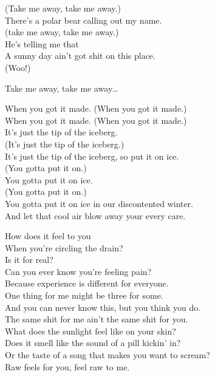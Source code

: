 (Take me away, take me away.) \\
There's a polar bear calling out my name. \\
(take me away, take me away.) \\
He's telling me that \\
A sunny day ain't got shit on this place. \\
(Woo!)

Take me away, take me away… \\


When you got it made. (When you got it made.) \\
When you got it made. (When you got it made.) \\

It's just the tip of the iceberg. \\
(It's just the tip of the iceberg.) \\
It's just the tip of the iceberg, so put it on ice. \\
(You gotta put it on.) \\

You gotta put it on ice. \\
(You gotta put it on.) \\
You gotta put it on ice in our discontented winter. \\
And let that cool air blow away your every care. \\




How does it feel to you \\
When you're circling the drain? \\
Is it for real? \\
Can you ever know you're feeling pain? \\

Because experience is different for everyone. \\
One thing for me might be three for some. \\
And you can never know this, but you think you do. \\
The same shit for me ain't the same shit for you. \\

What does the sunlight feel like on your skin? \\
Does it smell like the sound of a pill kickin' in? \\
Or the taste of a song that makes you want to scream? \\
Raw feels for you, feel raw to me. \\

